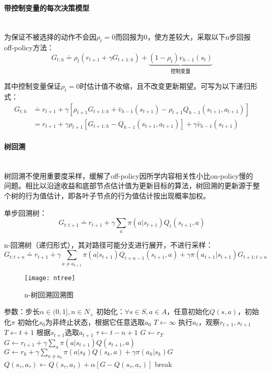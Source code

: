 \documentclass[
12pt, %
a4paper, 
oneside, %
headinclude,footinclude, %
]{scrartcl}
\begin{document}
\paragraph{带控制变量的每次决策模型}~\\

为保证不被选择的动作不会因$ \rho_t = 0 $而回报为$ 0 $，使方差较大，采取以下n步回报off-policy方法：
$$ G_{t:h} \doteq \rho_t (r_{t + 1} + \gamma G_{t + 1:h}) + \underbrace{(1 - \rho_t) v_{h - 1}(s_t)}_{\text{控制变量}} $$

其中控制变量保证$ \rho_t = 0 $时估计值不收缩，且不改变更新期望。可写为以下递归形式：
\begin{align*}
G_{t:h} 
&\doteq r_{t + 1} + \gamma[\rho_{t + 1} G_{t + 1:h} + \bar{v}_{h - 1}(s_{t + 1}) - \rho_{t + 1} Q_{h - 1}(s_{t + 1}, a_{t + 1})] \\
&= r_{t + 1} + \gamma \rho_{t + 1}[G_{t + 1:h} - Q_{h - 1}(s_{t + 1}, a_{t + 1})] + \gamma \bar{v}_{h - 1}(s_{t + 1})
\end{align*}
\paragraph{树回溯}~\\

树回溯不使用重要度采样，缓解了off-policy因所学内容相关性小比on-policy慢的问题。相比以沿途收益和底部节点估计值为更新目标的算法，树回溯的更新源于整个树的行为值估计，即各叶子节点的行为值估计按出现概率加权。

单步回溯树：
$$ G_{t:t + 1} \doteq r_{t + 1} + \gamma \sum_{a} \pi(a|s_{t + 1}) Q_t(s_{t + 1}, a) $$

n-回溯树（递归形式），其对路径可能分支进行展开，不进行采样：
$$ G_{t:t + n} \doteq r_{t + 1} + \gamma \sum_{a \neq a_{t + 1}} \pi(a|s_{t + 1}) Q_{t + n - 1}(s_{t + 1}, a) + \gamma \pi(a_{t + 1}|s_{t + 1}) G_{t + 1:t + n} $$

\begin{figure}[H]
\centering
\texttt{[image: ntree]}
\caption{n-树回溯回溯图}
\end{figure}
\begin{myalgorithm}[n-树回溯]
\State 参数：步长$ \alpha \in (0,1], n \in N_+ $
\State 初始化：$ \forall s \in S, a \in A $，任意初始化$ Q(s, a) $，初始化$ \pi $
\State 初始化$ s_0 $为非终止状态，根据它任意选取$ a_0 $
\State $ T \gets \infty $
\State 执行$ a_t $，观察$ r_{t + 1}, s_{t + 1} $
\State $ T \gets t + 1 $
\Else
\State 根据$ s_{t + 1} $选取$ a_{t + 1} $
\EndIf
\EndIf
\State $ \tau \gets t - n + 1 $ 
\State $ G \gets r_T $ 
\Else
\State $ G \gets r_{t + 1} + \gamma \sum_a \pi(a|s_{t + 1})Q(s_{t + 1}, a) $
\EndIf
{}
\State $ G \gets r_k + \gamma \sum_{a \neq a_k} \pi(a|s_k)Q(s_k,a) + \gamma \pi(a_k|s_k)G $
\EndFor
\State $ Q(s_{\tau}, a_{\tau}) \gets Q(s_{\tau}, a_{\tau}) + \alpha[G - Q(s_{\tau}, a_{\tau})] $
\EndIf
{}
\State break
\EndIf
\EndFor
\EndFor
\end{myalgorithm}
\end{document}

